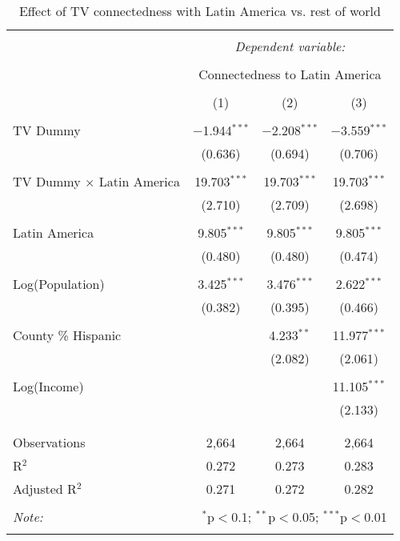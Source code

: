 
\begin{table}[!htbp] \centering 
  \caption{Effect of TV connectedness with Latin America vs. rest of world} 
  \label{} 
\begin{tabular}{@{\extracolsep{-5pt}}lccc} 
\\[-1.8ex]\hline 
\hline \\[-1.8ex] 
 & \multicolumn{3}{c}{\textit{Dependent variable:}} \\ 
\cline{2-4} 
\\[-1.8ex] & \multicolumn{3}{c}{Connectedness to Latin America} \\ 
\\[-1.8ex] & (1) & (2) & (3)\\ 
\hline \\[-1.8ex] 
 TV Dummy & $-$1.944$^{***}$ & $-$2.208$^{***}$ & $-$3.559$^{***}$ \\ 
  & (0.636) & (0.694) & (0.706) \\ 
  & & & \\ 
 TV Dummy $\times$ Latin America & 19.703$^{***}$ & 19.703$^{***}$ & 19.703$^{***}$ \\ 
  & (2.710) & (2.709) & (2.698) \\ 
  & & & \\ 
 Latin America & 9.805$^{***}$ & 9.805$^{***}$ & 9.805$^{***}$ \\ 
  & (0.480) & (0.480) & (0.474) \\ 
  & & & \\ 
 Log(Population) & 3.425$^{***}$ & 3.476$^{***}$ & 2.622$^{***}$ \\ 
  & (0.382) & (0.395) & (0.466) \\ 
  & & & \\ 
 County \% Hispanic &  & 4.233$^{**}$ & 11.977$^{***}$ \\ 
  &  & (2.082) & (2.061) \\ 
  & & & \\ 
 Log(Income) &  &  & 11.105$^{***}$ \\ 
  &  &  & (2.133) \\ 
  & & & \\ 
\hline \\[-1.8ex] 
Observations & 2,664 & 2,664 & 2,664 \\ 
R$^{2}$ & 0.272 & 0.273 & 0.283 \\ 
Adjusted R$^{2}$ & 0.271 & 0.272 & 0.282 \\ 
\hline 
\hline \\[-1.8ex] 
\textit{Note:}  & \multicolumn{3}{r}{$^{*}$p$<$0.1; $^{**}$p$<$0.05; $^{***}$p$<$0.01} \\ 
 & \multicolumn{3}{r}{} \\ 
\end{tabular} 
\end{table} 
